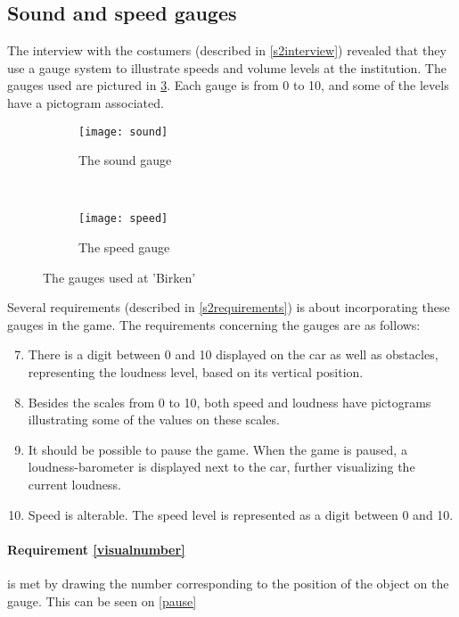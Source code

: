 \subsection{Sound and speed gauges}
The interview with the costumers (described in \cref{s2interview}) revealed that they use a gauge system to illustrate speeds and volume levels at the institution. 
The gauges used are pictured in \cref{gauges}.
Each gauge is from 0 to 10, and some of the levels have a pictogram associated.

\begin{figure}[h]
	\centering
        \begin{subfigure}[b]{0.5\textwidth}
                \texttt{[image: sound]}
                \caption{The sound gauge}
                \label{soundgauge}
        \end{subfigure}%
        ~
        \begin{subfigure}[b]{0.5\textwidth}
                \texttt{[image: speed]}
                \caption{The speed gauge}
                \label{speedgauge}
        \end{subfigure}
        \caption{The gauges used at 'Birken'}\label{fig:animals}
        \label{gauges}
\end{figure}

Several requirements (described in \cref{s2requirements}) is about incorporating these gauges in the game.
The requirements concerning the gauges are as follows:

\begin{enumerate}
\setcounter{enumi}{6}
\item \label{visualnumber} There is a digit between 0 and 10 displayed on the car as well as obstacles, representing the loudness level, based on its vertical position. 
\item \label{pictogram} Besides the scales from 0 to 10, both speed and loudness have pictograms illustrating some of the values on these scales.
\item \label{pause} It should be possible to pause the game. When the game is paused, a loudness-barometer is displayed next to the car, further visualizing the current loudness.
\item \label{speeditem} Speed is alterable. The speed level is represented as a digit between 0 and 10.
\end{enumerate}


\paragraph{Requirement \ref{visualnumber}} is met by drawing the number corresponding to the position of the object on the gauge. 
This can be seen on \cref{pause}

